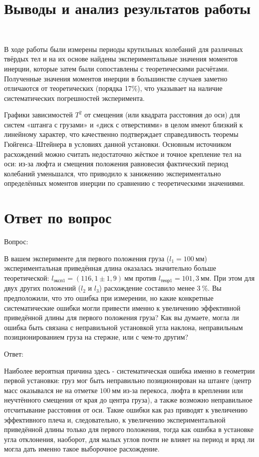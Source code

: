 \documentclass[a4paper,14pt]{article}
\begin{document}
    \section{Выводы и анализ результатов работы}

    ~


    В ходе работы были измерены периоды крутильных колебаний для различных твёрдых тел и на их основе найдены экспериментальные значения моментов инерции, которые затем были сопоставлены с теоретическими расчётами. Полученные значения моментов инерции в большинстве случаев заметно отличаются от теоретических (порядка 17\%), что указывает на наличие систематических погрешностей эксперимента.

    Графики зависимостей $T^2$ от смещения (или квадрата расстояния до оси) для систем «штанга с грузами» и «диск с отверстиями» в целом имеют близкий к линейному характер, что качественно подтверждает справедливость теоремы Гюйгенса–Штейнера в условиях данной установки. Основным источником расхождений можно считать недостаточно жёсткое и точное крепление тел на оси: из-за люфта и смещения положения равновесия фактический период колебаний уменьшался, что приводило к занижению экспериментально определённых моментов инерции по сравнению с теоретическими значениями.
    \section{Ответ по вопрос}

    Вопрос:

    В вашем эксперименте для первого положения груза (\(l_1 = 100\ \text{мм}\)) экспериментальная приведённая длина оказалась значительно больше теоретической: \(l_{\text{эксп}1} = (116{,}1 \pm 1{,}9)\ \text{мм}\) против \(l_{\text{теор}1} = 101{,}3\ \text{мм}\). При этом для двух других положений (\(l_2\) и \(l_3\)) расхождение составило менее \(3\ \%\). Вы предположили, что это ошибка при измерении, но какие конкретные систематические ошибки могли привести именно к увеличению эффективной приведённой длины для первого положения груза? Как вы думаете, могла ли ошибка быть связана с неправильной установкой угла наклона, неправильным позиционированием груза на стержне, или с чем-то другим?

    Ответ:

    Наиболее вероятная причина здесь - систематическая ошибка именно в геометрии первой установки: груз мог быть неправильно позиционирован на штанге (центр масс оказывался не на отметке \(100\ \text{мм}\) из‑за перекоса, люфта в креплении или неучтённого смещения от края до центра груза), а также возможно неправильное отсчитывание расстояния от оси. Такие ошибки как раз приводят к увеличению эффективного плеча и, следовательно, к увеличению экспериментальной приведённой длины только для первого положения, тогда как ошибка в установке угла отклонения, наоборот, для малых углов почти не влияет на период и вряд ли могла дать именно такое выборочное расхождение.
\end{document}
